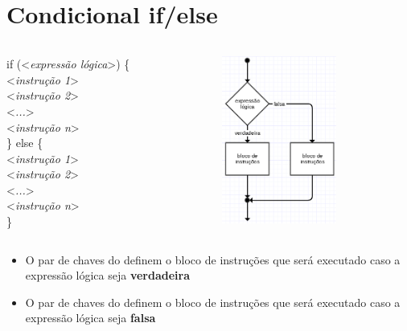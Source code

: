 \documentclass[portuguese,10pt,xcolor=table]{bredelebeamer}
\def\exp[#1]{\color{gray}<\textit{#1}>\color{black}}
\def\espaco{\color{gray}\hspace{0.2cm}\color{black}}
\begin{document}
	\section{Condicional if/else}
	\begin{frame}[c]
		\begin{center}
		\end{center}
	\end{frame} 
	\begin{frame} 

				\begin{columns}[t]
					\begin{column}[T]{.4\textwidth}
						if (\exp[expressão lógica]) \{\\
						\espaco \exp[instrução 1]\\
						\espaco \exp[instrução 2]\\
						\espaco \exp[...]\\
						\espaco \exp[instrução n]\\
						\} else \{\\
						\espaco \exp[instrução 1]\\
						\espaco \exp[instrução 2]\\
						\espaco \exp[...]\\
						\espaco \exp[instrução n]\\
						\}
					\end{column}
							\begin{column}[T]{.4\textwidth}
								\includegraphics[height=5.5cm]{imagens/condicional_ifelse.png}
							\end{column}
				\end{columns}

		\begin{itemize}
			\item O par de chaves do  definem o bloco de instruções que será executado caso a expressão lógica seja \textbf{verdadeira}
			\item O par de chaves do  definem o bloco de instruções que será executado caso a expressão lógica seja \textbf{falsa}
		\end{itemize}
	\end{frame}
\end{document}

